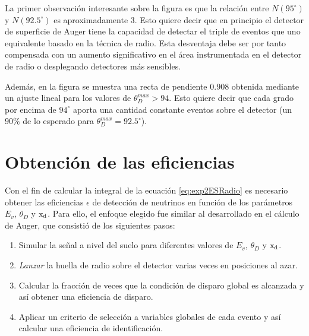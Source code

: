 	La primer observaci\'on interesante sobre la figura es que la relaci\'on entre $N(95^\circ)$ y $N(92.5^\circ)$ es aproximadamente 3.
	Esto quiere decir que en principio el detector de superficie de Auger tiene la capacidad de detectar el triple de eventos que uno equivalente basado en la t\'ecnica de radio.
	Esta desventaja debe ser por tanto compensada con un aumento significativo en el \'area instrumentada en el detector de radio o desplegando detectores m\'as sensibles.
	
	Adem\'as, en la figura se muestra una recta de pendiente 0.908 obtenida mediante un ajuste lineal para los valores de $\theta_D^{max}>94$.
	Esto quiere decir que cada grado por encima de $94^\circ$ aporta una cantidad constante eventos sobre el detector (un $90\%$ de lo esperado para $\theta_D^{max}=92.5^\circ$).
	
\section{Obtenci\'on de las eficiencias}
\label{sc:effRadio}

Con el fin de calcular la integral de la ecuaci\'on \ref{eq:exp2ESRadio} es necesario obtener las eficiencias $\epsilon$ de detecci\'on de neutrinos en funci\'on de los par\'ametros $E_v$, $\theta_D$ y ${\rm x_d}$. 
Para ello, el enfoque elegido fue similar al desarrollado en el c\'alculo de Auger, que consisti\'o de los siguientes pasos:
%
\begin{enumerate}
	\item Simular la se\~nal a nivel del suelo para diferentes valores de $E_v$, $\theta_D$ y ${\rm x_d}$.
	\item \emph{Lanzar} la huella de radio sobre el detector varias veces en posiciones al azar.
	\item Calcular la fracci\'on de veces que la condici\'on de disparo global es alcanzada y as\'i obtener una eficiencia de disparo.
	\item Aplicar un criterio de selecci\'on a variables globales de cada evento y as\'i calcular una eficiencia de identificaci\'on.
\end{enumerate}
%

